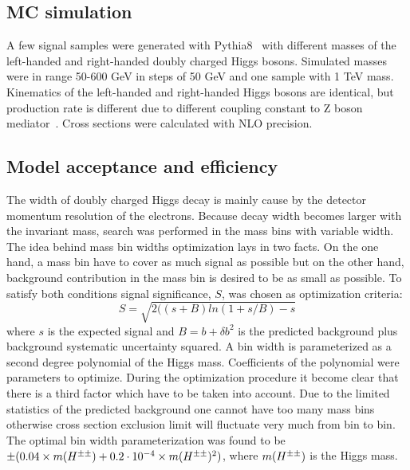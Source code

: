 \subsection{MC simulation}
A few signal samples were generated with Pythia8~\cite{pythia8} with different masses of the left-handed and right-handed doubly charged Higgs bosons.
Simulated masses were in range 50-600 GeV in steps of 50 GeV and one sample with 1 TeV mass.
Kinematics of the left-handed and right-handed Higgs bosons are identical, but production rate is different due to different coupling constant to Z boson mediator~\cite{dch_note}.
Cross sections were calculated with NLO precision. \toDo[link]

\subsection{Model acceptance and efficiency}
The width of doubly charged Higgs decay is mainly cause by the detector momentum resolution of the electrons.
Because decay width becomes larger with the invariant mass, search was performed in the mass bins with variable width.
The idea behind mass bin widths optimization lays in two facts. On the one hand, a mass bin have to cover as much signal as possible
but on the other hand, background contribution in the mass bin is desired to be as small as possible.
To satisfy both conditions signal significance, $S$, was chosen as optimization criteria:
\begin{equation}
 S = \sqrt{ 2((s+B)ln(1+s/B)-s } 
\end{equation}
where $s$ is the expected signal and $B=b+\delta b^2$ is the predicted background plus background systematic uncertainty squared.
A bin width is parameterized as a second degree polynomial of the Higgs mass.
Coefficients of the polynomial were parameters to optimize.
During the optimization procedure it become clear that there is a third factor which have to be taken into account.
Due to the limited statistics of the predicted background one cannot have too many mass bins otherwise cross section
exclusion limit will fluctuate very much from bin to bin. 
The optimal bin width parameterization was found to be $\pm(0.04 \times m(H^{\pm\pm}) + 0.2 \cdot 10^{-4} \times m(H^{\pm\pm})^{2})$,
where $m(H^{\pm\pm})$ is the Higgs mass.

